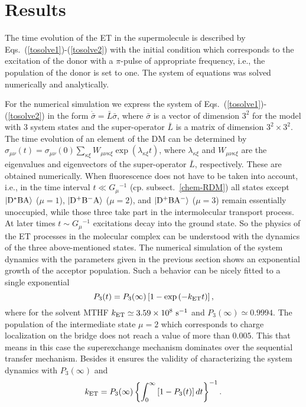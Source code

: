 \documentclass[12pt,twoside,a4paper]{report}
\begin{document}
\section{Results} \label{chem-results}
The time evolution of the ET in the supermolecule is described by
Eqs.~(\ref{tosolve1})-(\ref{tosolve2}) with the initial
condition which corresponds to the excitation of the donor with a
$\pi$-pulse of appropriate frequency, i.e., the population of the
donor is set to one.  The system of equations was 
 solved numerically and analytically.



For the numerical simulation we express the
 system of Eqs.~(\ref{tosolve1})-(\ref{tosolve2})
in the form $\dot{\bar\sigma}=\bar L \bar\sigma$, 
where $\bar\sigma$  
is a vector of dimension $3^2$ 
for the model with $3$ system states 
and
the  super-operator $\bar L$ is a matrix of dimension $3^2 \times 3^2$.
The time evolution of an element of the DM 
can be determined by
$\sigma
 _{\mu  
   \nu}
   (t)
          =
               \sigma_{\mu  \nu}(0)
               \sum_{\kappa \xi}
                   W_{\mu \nu \kappa \xi}
                   \exp{(\lambda_{\kappa \xi}t)}$,  
where $\lambda_{\kappa \xi}$ and $W_{ \mu  \nu  \kappa \xi}$  
are the eigenvalues and eigenvectors 
of the super-operator $\bar L$, respectively.
These are obtained numerically. 
When fluorescence does not have to be taken into account, 
i.e., in the time interval $t \ll{}G_\mu{}^{-1}$ (cp. subsect.~\ref{chem-RDM})
all states except $\left| {\rm D^*BA} \right>$ ($ \mu =1$), 
$\left| {\rm D^+B^-A} \right>$ ($ \mu =2$), 
and $\left| {\rm D^+BA^-} \right>$ ($ \mu =3$)
remain essentially unoccupied, while  those three
take part in the intermolecular transport process.
At later times $t \sim G_\mu{}^{-1}$ 
excitations decay into the ground state.
So the physics of the ET processes in the molecular complex
can be understood with the dynamics of the three above-mentioned
states.
The numerical simulation of the system dynamics  
with the parameters given in the previous section 
shows an exponential growth of the acceptor population. 
Such a behavior can be nicely fitted to a single exponential
\begin{equation}
\label{single-exponent}
P_3(t)
      =   P_3(\infty)
          \left[
              1-\exp{(-k_{\rm ET}t)}
          \right],
\end{equation}
where for the solvent MTHF 
$k_{\rm ET} \simeq 3.59 \times{}10^{8}~{\rm s}^{-1}$ and 
$P_3(\infty) \simeq 0.9994$. 
The population of  the intermediate state $ \mu =2$ which
corresponds to charge localization on the bridge 
does not reach a value of more than $0.005$. 
This that means in this case  
the  superexchange mechanism dominates over the sequential 
transfer mechanism.
Besides it ensures the validity of 
characterizing the system dynamics with 
$P_3(\infty)$ and 
\begin{eqnarray}
\label{fit}
k_{\rm ET}
          =   P_3(\infty)
              \left\{
                  \int_0^\infty 
                  \left[  
                      1-P_3(t) 
                  \right] dt 
              \right\}^{-1}. 
\end{eqnarray}
\end{document}
